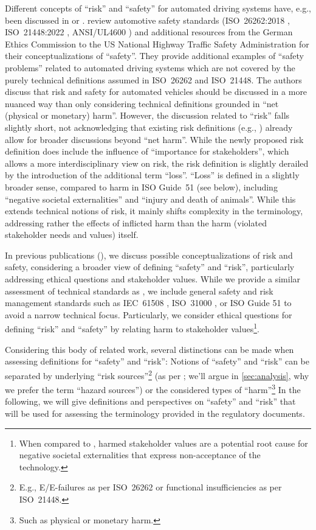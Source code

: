 Different concepts of ``risk'' and ``safety'' for automated driving systems have, e.g., been discussed in \parencite{koopman2024} or \parencite{salem2024}.
\citeauthor{koopman2024} \parencite{koopman2024} review automotive safety standards (ISO~26262:2018 \parencite{iso2018}, ISO~21448:2022 \parencite{iso21448}, ANSI/UL4600 \parencite{ul4600}) and additional resources from the German Ethics Commission \parencite{difabio2017} to the US National Highway Traffic Safety Administration for their conceptualizations of ``safety''.
They provide additional examples of ``safety problems'' related to automated driving systems which are not covered by the purely technical definitions assumed in ISO~26262 and ISO~21448.
The authors discuss that risk and safety for automated vehicles should be discussed in a more nuanced way than only considering technical definitions grounded in ``net (physical or monetary) harm''.
However, the discussion related to ``risk'' falls slightly short, not acknowledging that existing risk definitions (e.g., \parencite{fischhoff1984,renn1998}) already allow for broader discussions beyond ``net harm''.
While the newly proposed risk definition does include the influence of ``importance for stakeholders'', which allows a more interdisciplinary view on risk, the risk definition is slightly derailed by the introduction of the additional term ``loss''.
``Loss'' is defined in a slightly broader sense, compared to harm in ISO Guide~51 (see below), including ``negative societal externalities'' and ``injury and death of animals''.
While this extends technical notions of risk, it mainly shifts complexity in the terminology, addressing rather the effects of inflicted harm than the harm (violated stakeholder needs and values) itself.

In previous publications (\parencite{salem2024, nolte2024}), we discuss possible conceptualizations of risk and safety, considering a broader view of defining ``safety'' and ``risk'', particularly addressing ethical questions and stakeholder values.
While we provide a similar assessment of technical standards as \citeauthor{koopman2024}, we include general safety and risk management standards such as IEC~61508 \parencite{iec61508}, ISO~31000 \parencite{iso31000}, or ISO Guide 51 \parencite{iso51} to avoid a narrow technical focus.
Particularly, we consider ethical questions for defining ``risk'' and ``safety'' by relating harm to stakeholder values\footnote{When compared to \citeauthor{koopman2024}, harmed stakeholder values are a potential root cause for negative societal externalities that express non-acceptance of the technology.}.

Considering this body of related work, several distinctions can be made when assessing definitions for ``safety'' and ``risk'':
Notions of ``safety'' and ``risk'' can be separated by underlying ``risk sources''\footnote{E.g., E/E-failures as per ISO~26262 or functional insufficiencies as per ISO~21448.} (as per \parencite{christensen2003}; we'll argue in \cref{sec:analysis}, why we prefer the term ``hazard sources'') or the considered types of ``harm''\footnote{Such as physical or monetary harm.}
In the following, we will give definitions and perspectives on ``safety'' and ``risk'' that will be used for assessing the terminology provided in the regulatory documents.